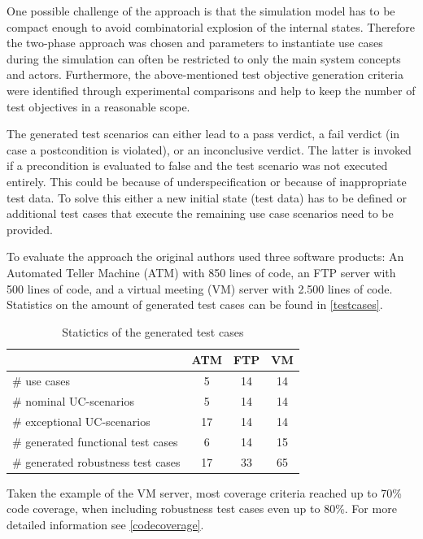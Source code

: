 One possible challenge of the approach is that the simulation model has to be compact enough to avoid combinatorial explosion of the internal states. Therefore the two-phase approach was chosen and parameters to instantiate use cases during the simulation can often be restricted to only the main system concepts and actors. Furthermore, the above-mentioned test objective generation criteria were identified through experimental comparisons and help to keep the number of test objectives in a reasonable scope. 

The generated test scenarios can either lead to a pass verdict, a fail verdict (in case a postcondition is violated), or an inconclusive verdict. The latter is invoked if a precondition is evaluated to false and the test scenario was not executed entirely. This could be because of underspecification or because of inappropriate test data. To solve this either a new initial state (test data) has to be defined or additional test cases that execute the remaining use case scenarios need to be provided. 

To evaluate the approach the original authors used three software products: An Automated Teller Machine (ATM) with 850 lines of code, an FTP server with 500 lines of code, and a virtual meeting (VM) server with 2.500 lines of code. Statistics on the amount of generated test cases can be found in \autoref{testcases}.

\begin{table}[h] 
	\centering
	\begin{small}
		\caption{Statictics of the generated test cases}
		\label{testcases}
		\setlength{\tabcolsep}{1em}
		\begin{tabular}{l|c|c|c}
			\hline
			& \textbf{ATM} & \textbf{FTP} & \textbf{VM} \\
			\hline
			\# use cases & 5 & 14 & 14 \\
			\hline
			\# nominal UC-scenarios & 5 & 14 & 14 \\
			\hline
			\# exceptional UC-scenarios & 17 & 14 & 14 \\
			\hline
			\# generated functional test cases & 6 & 14 & 15 \\
			\hline
			\# generated robustness test cases & 17 & 33 & 65 \\
			\hline
		\end{tabular}
	\end{small}
\end{table}

Taken the example of the VM server, most coverage criteria reached up to 70\% code coverage, when including robustness test cases even up to 80\%. For more detailed information see \autoref{codecoverage}.

